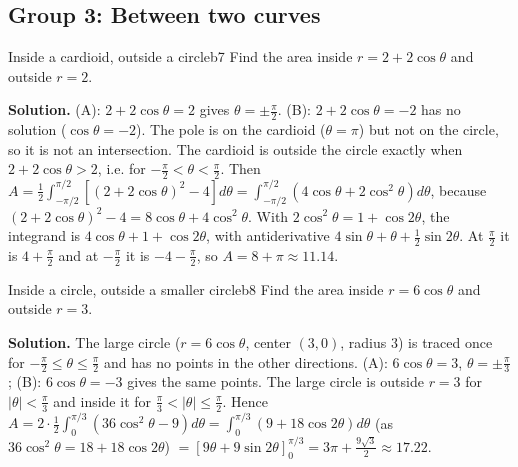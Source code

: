 \documentclass[11pt]{article}
\begin{document}
\subsection*{Group 3: Between two curves}

\begin{exmp}{Inside a cardioid, outside a circle}{b7}
Find the area inside $r=2+2\cos\theta$ and outside $r=2$.

\textbf{Solution.} (A): $2+2\cos\theta=2$ gives $\theta=\pm\frac\pi2$. (B): $2+2\cos\theta=-2$ has no solution ($\cos\theta=-2$). The pole is on the cardioid ($\theta=\pi$) but not on the circle, so it is not an intersection. The cardioid is outside the circle exactly when $2+2\cos\theta>2$, i.e. for $-\frac\pi2<\theta<\frac\pi2$. Then $A=\frac12\int_{-\pi/2}^{\pi/2}\left[(2+2\cos\theta)^2-4\right]d\theta=\int_{-\pi/2}^{\pi/2}\left(4\cos\theta+2\cos^2\theta\right)d\theta$, because $(2+2\cos\theta)^2-4=8\cos\theta+4\cos^2\theta$. With $2\cos^2\theta=1+\cos2\theta$, the integrand is $4\cos\theta+1+\cos2\theta$, with antiderivative $4\sin\theta+\theta+\frac12\sin2\theta$. At $\frac\pi2$ it is $4+\frac\pi2$ and at $-\frac\pi2$ it is $-4-\frac\pi2$, so $A=8+\pi\approx11.14$.
\end{exmp}

\begin{exmp}{Inside a circle, outside a smaller circle}{b8}
Find the area inside $r=6\cos\theta$ and outside $r=3$.

\textbf{Solution.} The large circle ($r=6\cos\theta$, center $(3,0)$, radius $3$) is traced once for $-\frac\pi2\le\theta\le\frac\pi2$ and has no points in the other directions. (A): $6\cos\theta=3$, $\theta=\pm\frac\pi3$; (B): $6\cos\theta=-3$ gives the same points. The large circle is outside $r=3$ for $|\theta|<\frac\pi3$ and inside it for $\frac\pi3<|\theta|\le\frac\pi2$. Hence $A=2\cdot\frac12\int_0^{\pi/3}\left(36\cos^2\theta-9\right)d\theta=\int_0^{\pi/3}\left(9+18\cos2\theta\right)d\theta$ (as $36\cos^2\theta=18+18\cos2\theta$) $=\left[9\theta+9\sin2\theta\right]_0^{\pi/3}=3\pi+\frac{9\sqrt3}2\approx17.22$.
\end{exmp}
\end{document}
